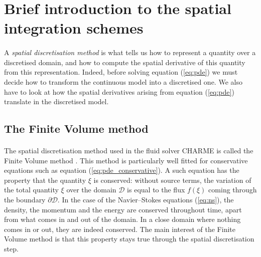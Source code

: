   \section{Brief introduction to the spatial integration schemes}

    \paragraph{}
    A \emph{spatial discretisation method} is what tells us how to represent a quantity over a discretised domain, and how to compute the spatial derivative of this quantity from this representation.
    Indeed, before solving equation (\ref{eq:pde}) we must decide how to transform the continuous model into a discretised one.
    We also have to look at how the spatial derivatives arising from equation (\ref{eq:pde}) translate in the discretised model.

    \subsection{The Finite Volume method}

      \paragraph{}
      The spatial discretisation method used in the fluid solver CHARME is called the Finite Volume method \cite{EymardGallouetHerbin2000, Leterrier2003}.
      This method is particularly well fitted for conservative equations such as equation (\ref{eq:pde_conservative}).
      A such equation has the property that the quantity $\xi$ is conserved: without source terms, the variation of the total quantity $\xi$ over the domain $\mathcal{D}$ is equal to the flux $f\left(\xi\right)$ coming through the boundary $\partial\mathcal{D}$.
      In the case of the Navier--Stokes equations (\ref{eq:ns}), the density, the momentum and the energy are conserved throughout time, apart from what comes in and out of the domain.
      In a close domain where nothing comes in or out, they are indeed conserved.
      The main interest of the Finite Volume method is that this property stays true through the spatial discretisation step.

